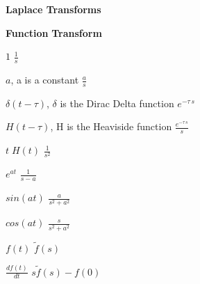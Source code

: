 \begin{flushleft}
\begin{questions}
{{\begin{solution}[0.75in]
\end{solution}}}
\pagebreak
\end{questions}\end{flushleft}
\pagebreak
\thispagestyle{head}
\begin{center}
\textbf{Laplace Transforms}
\end{center}


\textbf{Function} \hfill \textbf{Transform}

$1$ \hfill $\displaystyle\frac{1}{s}$

$a$, a is a constant \hfill $\displaystyle\frac{a}{s}$

$\delta(t-\tau)$, $\delta$ is the Dirac Delta function \hfill $e^{-\tau\, s}$

$H(t-\tau)$, H is the Heaviside function \hfill $\displaystyle\frac{e^{-\tau\,s}}{s}$

$t\;H(t)$ \hfill $\displaystyle\frac{1}{s^2}$

$e^{at}$ \hfill $\displaystyle\frac{1}{s-a}$

$sin(a t)$ \hfill $\displaystyle\frac{a}{s^2+a^2}$

$cos(a t)$ \hfill $\displaystyle\frac{s}{s^2+a^2}$

$f(t)$ \hfill $\tilde{f}(s)$

$\displaystyle\frac{df(t)}{dt}$ \hfill $s \tilde{f}(s) - f(0)$









